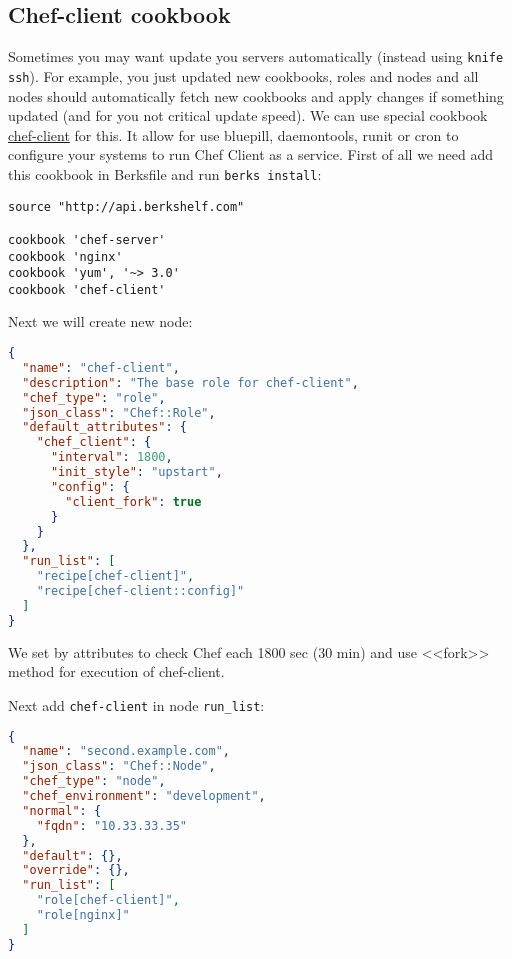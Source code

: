 \subsection{Chef-client cookbook}

Sometimes you may want update you servers automatically (instead using \lstinline!knife ssh!). For example, you just updated new cookbooks, roles and nodes and all nodes should automatically fetch new cookbooks and apply changes if something updated (and for you not critical update speed). We can use special cookbook \href{https://supermarket.getchef.com/cookbooks/chef-client}{chef-client} for this. It allow for use bluepill, daemontools, runit or cron to configure your systems to run Chef Client as a service. First of all we need add this cookbook in Berksfile and run \lstinline!berks install!:

\begin{lstlisting}[label=lst:my-server-cloud-knife-ssh6,title=my-server-cloud/Berksfile]
source "http://api.berkshelf.com"

cookbook 'chef-server'
cookbook 'nginx'
cookbook 'yum', '~> 3.0'
cookbook 'chef-client'
\end{lstlisting}

Next we will create new node:

\begin{lstlisting}[language=JSON,label=lst:my-server-cloud-knife-ssh7,title=my-server-cloud/roles/chef-client.json]
{
  "name": "chef-client",
  "description": "The base role for chef-client",
  "chef_type": "role",
  "json_class": "Chef::Role",
  "default_attributes": {
    "chef_client": {
      "interval": 1800,
      "init_style": "upstart",
      "config": {
        "client_fork": true
      }
    }
  },
  "run_list": [
    "recipe[chef-client]",
    "recipe[chef-client::config]"
  ]
}
\end{lstlisting}

We set by attributes to check Chef each 1800 sec (30 min) and use <<fork>> method for execution of chef-client.

Next add \lstinline!chef-client! in node \lstinline!run_list!:

\begin{lstlisting}[language=JSON,label=lst:my-server-cloud-knife-ssh8,title=my-server-cloud/nodes/second.example.com.json]
{
  "name": "second.example.com",
  "json_class": "Chef::Node",
  "chef_type": "node",
  "chef_environment": "development",
  "normal": {
    "fqdn": "10.33.33.35"
  },
  "default": {},
  "override": {},
  "run_list": [
    "role[chef-client]",
    "role[nginx]"
  ]
}
\end{lstlisting}

